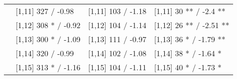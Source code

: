 \begin{table}
\begin{tabular}[t]{llll}
 & {}[1,11] 327  / -0.98 & {}[1,11] 103  / -1.18 & {}[1,11] 30 ** / -2.4 **\\
 & {}[1,12] 308 * / -0.92 & {}[1,12] 104  / -1.14 & {}[1,12] 26 ** / -2.51 **\\
\addlinespace
 & {}[1,13] 300 * / -1.09 & {}[1,13] 111  / -0.97 & {}[1,13] 36 * / -1.79 **\\
 & {}[1,14] 320  / -0.99 & {}[1,14] 102  / -1.08 & {}[1,14] 38 * / -1.64 *\\
 & {}[1,15] 313 * / -1.16 & {}[1,15] 104  / -1.11 & {}[1,15] 40 * / -1.73 *\\
\bottomrule
\end{tabular}
\end{table}
